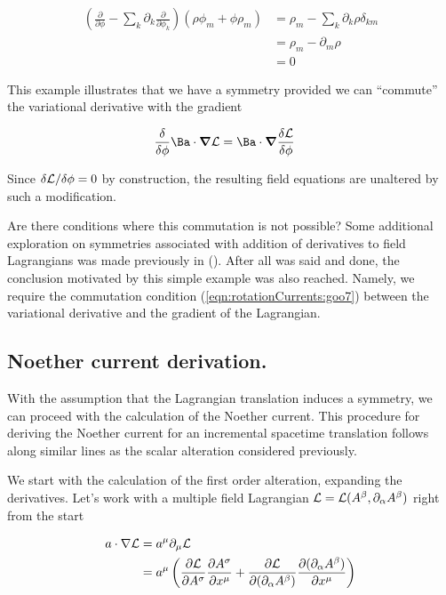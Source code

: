 \begin{align*}
\left( \frac{\partial }{\partial \phi} - \sum_k \partial_k \frac{\partial }{\partial \phi_k}\right) (\rho \phi_m + \phi \rho_m) 
&=
\rho_m - \sum_k \partial_k \rho \delta_{km} \\
&=
\rho_m - \partial_m \rho  \\
&= 0
\end{align*}

This example illustrates that we have a symmetry provided we can ``commute'' the variational derivative with the gradient

\begin{align}\label{eqn:rotationCurrents:goo7}
\frac{\delta }{\delta \phi} \Ba \cdot \spacegrad \LL
&=
\Ba \cdot \spacegrad \frac{\delta \LL}{\delta \phi} 
\end{align}

Since ${\delta \LL}/{\delta \phi} = 0$ by construction, the resulting field equations are unaltered by such a modification.

Are there conditions where this commutation is not possible?  Some additional exploration on symmetries associated with addition of derivatives to field Lagrangians was made previously in (\cite{stressEnergyNoethers}).  After all was said and done, the conclusion motivated by this simple example was also reached.  Namely, we require the commutation condition (\ref{eqn:rotationCurrents:goo7}) between the variational derivative and the gradient of the Lagrangian.

\subsection{Noether current derivation.}

With the assumption that the Lagrangian translation induces a symmetry, we can proceed with the calculation of the Noether current.  This procedure for deriving the Noether current for an incremental spacetime translation follows along similar lines as the scalar alteration considered previously.

We start with the calculation of the first order alteration, expanding the derivatives.  Let's work with a multiple field Lagrangian $\LL = \LL(A^\beta, \partial_\alpha A^\beta)$ right from the start

\begin{align*}
a \cdot \grad \LL
&=
a^\mu \partial_\mu \LL \\
&=
a^\mu \left(
\PD{A^\sigma}{\LL} \PD{x^\mu}{A^\sigma}
+\PD{(\partial_\alpha A^\beta)}{\LL} \PD{x^\mu}{(\partial_\alpha A^\beta)}
\right) \\
\end{align*}

